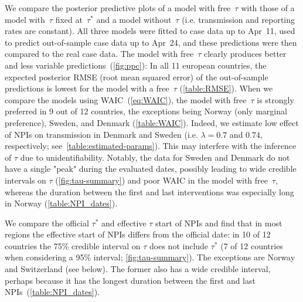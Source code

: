 \documentclass[12pt]{extarticle}
\begin{document}
We compare the posterior predictive plots of a model with  free~$\tau$ with those of a model with~$\tau$ fixed at~$\tau^*$ and a model without~$\tau$ (i.e. transmission and reporting rates are constant).
All three models were fitted to case data up to Apr~11, used to predict out-of-sample case data up to Apr~24, and these predictions were then compared to the real case data. 
The model with free~$\tau$ clearly produces better and less variable predictions~(\autoref{fig:ppc}):
In all 11 european countries, the expected posterior RMSE (root mean squared error) of the out-of-sample predictions is lowest for the model with a free~$\tau$ (\autoref{table:RMSE}).
When we compare the models using WAIC~(\autoref{eq:WAIC}), the model with free~$\tau$ is strongly preferred in 9 out of 12 countries, the exceptions being Norway (only marginal preference), Sweden, and Denmark (\autoref{table:WAIC}).
Indeed, we estimate low effect of NPIs on transmission in Denmark and Sweden (i.e. $\lambda=0.7$ and $0.74$, respectively; see~\autoref{table:estimated-params}).
This may interfere with the inference of $\tau$ due to unidentifiability. 
Notably, the data for Sweden and Denmark do not have a single "peak" during the evaluated dates, possibly leading to wide credible intervals on $\tau$ (\autoref{fig:tau-summary}) and poor WAIC in the model with free~$\tau$, whereas the duration between the first and last interventions was especially long in Norway (\autoref{table:NPI_dates}).

We compare the official $\tau^*$ and effective $\tau$ start of NPIs and find that in most regions the effective start of NPIs differs from the official date: in 10 of 12 countries the 75\% credible interval on $\tau$ does not include $\tau^*$ (7 of 12 countries when considering a 95\% interval; \autoref{fig:tau-summary}).
The exceptions are Norway and Switzerland (see below).
The former also has a wide credible interval, perhaps because it has the longest duration between the first and last NPIs~(\autoref{table:NPI_dates}).
\end{document}
